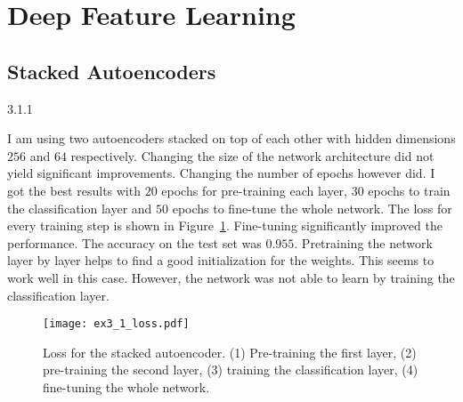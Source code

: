
\section{Deep Feature Learning}
\label{ex:3}


\subsection{Stacked Autoencoders}
\label{ex:3.1}

\begin{task}{3.1.1}
\end{task}

I am using two autoencoders stacked on top of each other with hidden dimensions $256$ and $64$
respectively. Changing the size of the network architecture did not yield significant improvements.
Changing the number of epochs however did. I got the best results with $20$ epochs for pre-training
each layer, $30$ epochs to train the classification layer and $50$ epochs to fine-tune the whole
network. The loss for every training step is shown in Figure~\ref{fig:ex3_1_loss}. Fine-tuning
significantly improved the performance. The accuracy on the test set was $0.955$. Pretraining the
network layer by layer helps to find a good initialization for the weights. This seems to work
well in this case. However, the network was not able to learn by training the classification layer.

\begin{figure}[ht!]
  \centering
  \texttt{[image: ex3\_1\_loss.pdf]}
  \caption{Loss for the stacked autoencoder. (1) Pre-training the first layer, (2) pre-training the
    second layer, (3) training the classification layer, (4) fine-tuning the whole network.}
  \label{fig:ex3_1_loss}
\end{figure}


